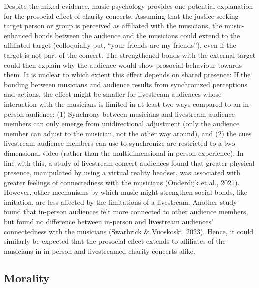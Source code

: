 \documentclass[
  man,floatsintext]{apa6}
\begin{document}
Despite the mixed evidence, music psychology provides one potential explanation for the prosocial effect of charity concerts. Assuming that the justice-seeking target person or group is perceived as affiliated with the musicians, the music-enhanced bonds between the audience and the musicians could extend to the affiliated target (colloquially put, ``your friends are my friends''), even if the target is not part of the concert. The strengthened bonds with the external target could then explain why the audience would show prosocial behaviour towards them. It is unclear to which extent this effect depends on shared presence: If the bonding between musicians and audience results from synchronized perceptions and actions, the effect might be smaller for livestream audiences whose interaction with the musicians is limited in at least two ways compared to an in-person audience: (1) Synchrony between musicians and livestream audience members can only emerge from unidirectional adjustment (only the audience member can adjust to the musician, not the other way around), and (2) the cues livestream audience members can use to synchronize are restricted to a two-dimensional video (rather than the multidimensional in-person experience). In line with this, a study of livestream concert audiences found that greater physical presence, manipulated by using a virtual reality headset, was associated with greater feelings of connectedness with the musicians (Onderdijk et al., 2021). However, other mechanisms by which music might strengthen social bonds, like imitation, are less affected by the limitations of a livestream. Another study found that in-person audiences felt more connected to other audience members, but found no difference between in-person and livestream audiences' connectedness with the musicians (Swarbrick \& Vuoskoski, 2023). Hence, it could similarly be expected that the prosocial effect extends to affiliates of the musicians in in-person and livestreamed charity concerts alike.

\subsection{Morality}\label{morality}
\end{document}
